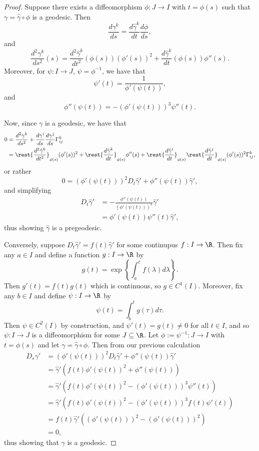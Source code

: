 \begin{proof}
Suppose there exists a diffeomorphism $\phi:J\to I$ with $t=\phi(s)$ such that $\gamma=\hat{\gamma}\circ\phi$ is a geodesic.  Then
$$\frac{d\gamma^k}{ds}=\frac{d\hat{\gamma}^k}{dt}\frac{d\phi}{ds},$$
and
$$\frac{d^2\gamma^k}{ds^2}(s)=\frac{d^2\hat{\gamma}^k}{dt^2}(\phi(s))(\phi'(s))^2+\frac{d\hat{\gamma}^k}{dt}(\phi(s))\phi''(s).$$
Moreover, for $\psi:I\to J$, $\psi=\phi^{-1}$, we have that
$$\psi'(t)=\frac{1}{\phi'(\psi(t))},$$
and
$$\phi''(\psi(t))=-(\phi'(\psi(t)))^3\psi''(t).$$

Now, since $\gamma$ is a geodesic, we have that
\begin{align*}
	0&=\frac{d^2\gamma^k}{ds^2}+\frac{d\gamma^i}{ds}\frac{d\gamma^j}{ds}\Gamma_{ij}^k\\
	&=\rest{\frac{d^2\hat{\gamma}^k}{dt^2}}_{\phi(s)}(\phi'(s))^2+\rest{\frac{d\hat{\gamma}^k}{dt}}_{\phi(s)}\phi''(s)+\rest{\frac{d\hat{\gamma}^i}{dt}}_{\phi(s)}\rest{\frac{d\hat{\gamma}^j}{dt}}_{\phi(s)}(\phi'(s))^2\Gamma_{ij}^k,
\end{align*}
or rather
$$0=(\phi'(\psi(t)))^2D_t\hat{\gamma}'+\phi''(\psi(t))\hat{\gamma}',$$
and simplifying
\begin{align*}
	D_t\hat{\gamma}'&=-\frac{\phi''(\psi(t))}{(\phi'(\psi(t)))^2}\hat{\gamma}'\\
	&=\phi'(\psi(t))\psi''(t)\hat{\gamma}',
\end{align*}
thus showing $\hat{\gamma}$ is a pregeodesic.

Conversely, suppose $D_t\hat{\gamma}'=f(t)\hat{\gamma}'$ for some continupus $f:I\to\R$.  Then fix any $a\in I$ and define a function $g:I\to\R$ by
$$g(t)=\exp\left\{\int_a^t f(\lambda)d\lambda\right\}.$$
Then $g'(t)=f(t)g(t)$ which is continuous, so $g\in C^1(I)$.  Moreover, fix any $b\in I$ and define $\psi:I\to\R$ by
$$\psi(t)=\int_b^tg(\tau)d\tau.$$
Then $\psi\in C^2(I)$ by construction, and $\psi'(t)=g(t)\neq0$ for all $t\in I$, and so $\psi:I\to J$ is a diffeomorphism for some $J\subseteq\R$.  Let $\phi:=\psi^{-1}:J\to I$ with $t=\phi(s)$ and let $\gamma=\hat{\gamma}\circ\phi$.  Then from our previous calculation
\begin{align*}
	D_s\gamma'&=(\phi'(\psi(t)))^2D_t\hat{\gamma}'+\phi''(\psi(t))\hat{\gamma}'\\
	&=\hat{\gamma}'(f(t)\phi'(\psi(t))^2+\phi''(\psi(t)))\\
	&=\hat{\gamma}'(f(t)\phi'(\psi(t))^2-(\phi'(\psi(t)))^3\psi''(t))\\
	&=\hat{\gamma}'(f(t)\phi'(\psi(t))^2-(\phi'(\psi(t)))^3f(t)\psi'(t))\\
	&=f(t)\hat{\gamma}'((\phi'(\psi(t)))^2-(\phi'(\psi(t)))^2)\\
	&=0,
\end{align*}
thus showing that $\gamma$ is a geodesic.
\end{proof}

